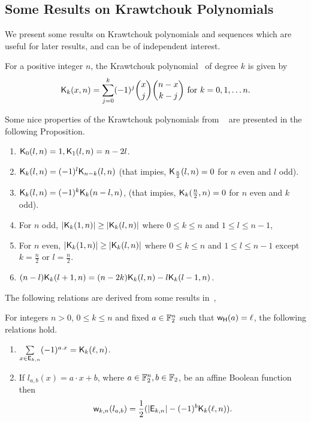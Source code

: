 \documentclass{llncs}
\begin{document}
\subsection{Some Results on Krawtchouk Polynomials}\label{ssec:KP}
We present some results on Krawtchouk polynomials and sequences which are useful for later results, and can be of independent interest.
\begin{definition}\label{def:Kr}
For a positive integer $n$, the Krawtchouk polynomial~\cite[Page $151$]{MacSlo78} of degree $k$ is given by 
\[\mathsf{K}_{k}(x,n)= \sum_{j=0}^{k} (-1)^j {x \choose j} {n-x \choose k-j} \text{ for } k = 0, 1, \ldots n.\]
\end{definition}
Some nice properties of the Krawtchouk polynomials from ~\cite[Proposition 4, Corollary 1]{DCC:DMS06} are presented in the following Proposition.
\begin{proposition}\label{prop:krawprop}
\begin{enumerate}
\item\label{itm1} $\mathsf{K}_{0}(l,n)=1, \mathsf{K}_{1}(l,n)= n-2l$.
\item\label{itm2} $\mathsf{K}_{k}(l,n) = (-1)^l \mathsf{K}_{n-k}(l,n)$ (that impies, $\mathsf{K}_{\frac{n}{2}}(l,n)=0$ for $n$ even and $l$ odd).
\item\label{itm3} $\mathsf{K}_{k}(l,n)= (-1)^k \mathsf{K}_{k}(n-l,n)$, (that impies, $\mathsf{K}_{k}(\frac{n}{2},n) = 0$ for $n$ even and $k$ odd).
\item\label{itm4} For $n$ odd, $|\mathsf{K}_{k}(1,n)| \geq |\mathsf{K}_{k}(l,n)|$ where $0 \leq k \leq n$ and $ 1 \leq l \leq n-1$,
\item\label{itm5} For $n$ even, $|\mathsf{K}_{k}(1,n)| \geq |\mathsf{K}_{k}(l,n)|$ where $0 \leq k \leq n$ and $1 \leq l \leq n-1$ except $k = \frac{n}{2}$ or $l = \frac{n}{2}$.
\item\label{itm6} $(n-l)\mathsf{K}_{k}(l+1,n) = (n-2k) \mathsf{K}_{k}(l,n) - l   \mathsf{K}_{k}(l-1,n)$.
\end{enumerate}
\end{proposition}
The following relations are derived from some results in~\cite{DCC:DMS06,DAM:GinMea22}, 
\begin{theorem} \label{thm:Kraw}
For integers $n > 0$, $0 \leq k \leq n$ and fixed $a \in \mathbb{F}_2^n$ such that $\mathsf{w_H}(a) = \ell$, the following relations hold.
\begin{enumerate}
\item $\sum\limits_{x \in \mathsf{E}_{k,n}} (-1)^{a.x} = \mathsf{K}_{k}(\ell,n)$.
\item If $l_{a,b}(x)= a \cdot x + b$, where $a \in \mathbb{F}_2^n, b \in \mathbb{F}_2$, be an affine Boolean function then 
\[\mathsf{w}_{k,n}(l_{a,b}) = \frac{1}{2} (|\mathsf{E}_{k,n}| - (-1)^b \mathsf{K}_{k}(\ell,n)).\]
\end{enumerate}
\end{theorem}
\end{document}
